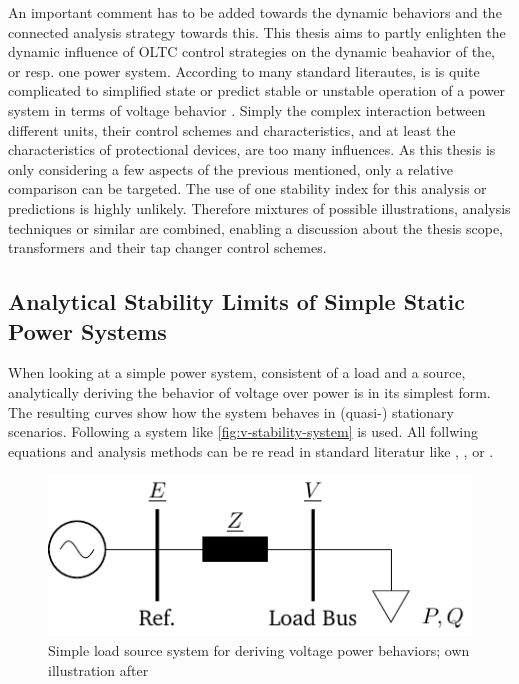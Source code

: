 An important comment has to be added towards the dynamic behaviors and the connected analysis strategy towards this.
This thesis aims to partly enlighten the dynamic influence of \acs{OLTC} control strategies on the dynamic beahavior of the, or resp. one power system.
According to many standard literautes, is is quite complicated to simplified state or predict stable or unstable operation of a power system in terms of voltage behavior \autocite{machowski_2020}.
Simply the complex interaction between different units, their control schemes and characteristics, and at least the characteristics of protectional devices, are too many influences.
As this thesis is only considering a few aspects of the previous mentioned, only a relative comparison can be targeted.
The use of one stability index for this analysis or predictions is highly unlikely.
Therefore mixtures of possible illustrations, analysis techniques or similar are combined, enabling a discussion about the thesis scope, transformers and their tap changer control schemes.  
        
\subsection{Analytical Stability Limits of Simple Static Power Systems}
\label{sec:analytical-voltage-stability}

When looking at a simple power system, consistent of a load and a source, analytically deriving the behavior of voltage over power is in its simplest form.
The resulting curves show how the system behaves in (quasi-) stationary scenarios.
Following a system like \autoref{fig:v-stability-system} is used. 
All follwing equations and analysis methods can be re read in standard literatur like \textcite{machowski_2020}, \textcite{kundur_2022}, or \autocite{cutsem_1998}. 

\begin{figure}[htbp!]
    \centering
    \includegraphics{./tikz_graphics/images/analytical_model.pdf}
    \caption[Simple load source system for deriving voltage power behaviors]{Simple load source system for deriving voltage power behaviors; own illustration after \autocite{machowski_2020,kundur_2022,milano_2010}}
    \label{fig:v-stability-system}
\end{figure}


